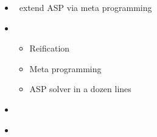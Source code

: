 \begin{frame}{\metasp}
  \begin{itemize}
  \item {} \ extend ASP via meta programming
  \item {} \
    \begin{itemize}
    \item Reification
    \item Meta programming
    \item ASP solver in a dozen lines
    \end{itemize}
  \item {}   \ \cite{gekasc11b,karoscwa21a}
  \item {} \ \cite{brderosc15b,digelurosc18a}
  \end{itemize}
\end{frame}
%
